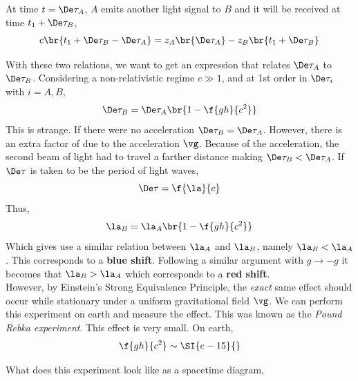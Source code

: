 \documentclass{article}
\begin{document}
At time $t = \De \tau_A$, $A$ emits another light signal to $B$ and it will be received at time $t_1 + \De \tau_B$,
\[ c\br{t_1 + \De \tau_B - \De \tau_A} = z_A\br{\De\tau_A} - z_B \br{t_1 + \De \tau_B} \]

With these two relations, we want to get an expression that relates $\De \tau_A$ to $\De \tau_B$. Considering a non-relativistic regime $c \gg 1$, and at 1st order in $\De \tau_i$ with $i = A,B$,
\[ \De \tau_B = \De \tau_A \br{1 - \f{gh}{c^2}} \]
This is strange. If there were no acceleration $\De \tau_B = \De \tau_A$. However, there is an extra factor of due to the acceleration $\vg$. Because of the acceleration, the second beam of light had to travel a farther distance making $\De \tau_B < \De \tau_A$. If $\De \tau$ is taken to be the period of light waves,
\[ \De \tau = \f{\la}{c} \]
Thus,
\[ \la_B = \la_A \br{1 - \f{gh}{c^2}} \]
Which gives use a similar relation between $\la_A$ and $\la_B$, namely $\la_B < \la_A$. This corresponds to a \textbf{blue shift}. Following a similar argument with $g \to - g$ it becomes that $\la_B > \la_A$ which corresponds to a \textbf{red shift}. \\

However, by Einstein's Strong Equivalence Principle, the \textit{exact} same effect should occur while stationary under a uniform gravitational field $\vg$. We can perform this experiment on earth and measure the effect. This was known as the \textit{Pound Rebka experiment}. This effect is very small. On earth,
\[ \f{gh}{c^2} \sim \SI{e-15}{} \]

What does this experiment look like as a spacetime diagram,


\begin{center}
\end{center}
\end{document}
